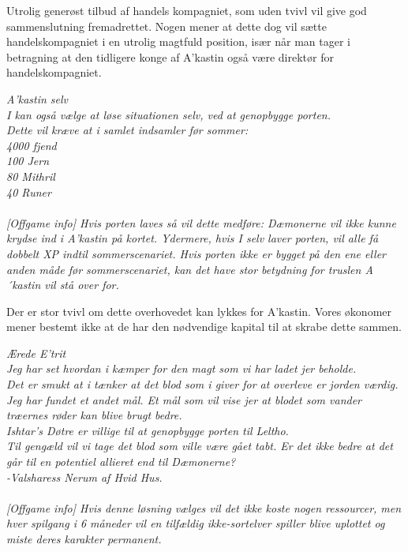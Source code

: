\documentclass[letterpaper,12pt]{memoir}
\newenvironment{pullquote}
  {\begin{tcolorbox}[enhanced, breakable]\itshape\large}
  {\end{tcolorbox}}
\begin{document}
Utrolig generøst tilbud af handels kompagniet, som uden tvivl vil give god sammenslutning fremadrettet. Nogen mener at dette dog vil sætte handelskompagniet i en utrolig magtfuld position, især når man tager i betragning at den tidligere konge af A'kastin også være direktør for handelskompagniet.

\begin{pullquote}
A'kastin selv \\
I kan også vælge at løse situationen selv, ved at genopbygge porten. \\
Dette vil kræve at i samlet indsamler før sommer: \\
4000 fjend \\
100 Jern \\
80 Mithril \\
40 Runer \\\\[3\baselineskip]
[Offgame info] Hvis porten laves så vil dette medføre: Dæmonerne vil ikke kunne krydse ind i A'kastin på kortet. Ydermere, hvis I selv laver porten, vil alle få dobbelt XP indtil sommerscenariet. Hvis porten ikke er bygget på den ene eller anden måde før sommerscenariet, kan det have stor betydning for truslen A´kastin vil stå over for.  
\end{pullquote}

Der er stor tvivl om dette overhovedet kan lykkes for A'kastin. Vores økonomer mener bestemt ikke at de har den nødvendige kapital til at skrabe dette sammen.

\begin{pullquote}
  Ærede E'trit\\
  Jeg har set hvordan i kæmper for den magt som vi har ladet jer beholde.\\
  Det er smukt at i tænker at det blod som i giver for at overleve er jorden værdig.\\
  Jeg har fundet et andet mål. Et mål som vil vise jer at blodet som vander træernes røder kan blive brugt bedre.\\
  Ishtar's Døtre er villige til at genopbygge porten til Leltho.\\
  Til gengæld vil vi tage det blod som ville være gået tabt. Er det ikke bedre at det går til en potentiel allieret end til Dæmonerne?\\
  -Valsharess Nerum af Hvid Hus.\\\\[3\baselineskip]
  [Offgame info] Hvis denne løsning vælges vil det ikke koste nogen ressourcer, men hver spilgang i 6 måneder vil en tilfældig ikke-sortelver spiller blive uplottet og miste deres karakter permanent.
\end{pullquote}
\end{document}
